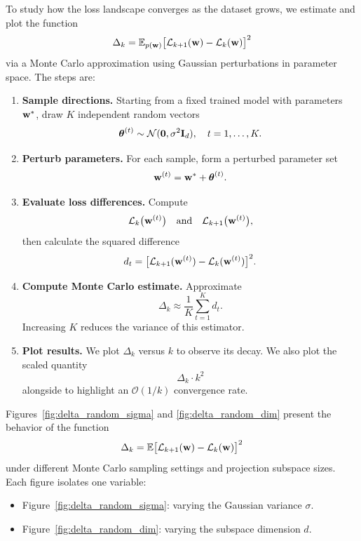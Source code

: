 \documentclass{article}
\begin{document}
To study how the loss landscape converges as the dataset grows, we estimate and plot the function
$$
  \Delta_k =
  \mathbb{E}_{p(\mathbf{w})} \bigl[ \mathcal{L}_{k+1}(\mathbf{w}) - \mathcal{L}_k(\mathbf{w}) \bigr]^2
$$
via a Monte Carlo approximation using Gaussian perturbations in parameter space. The steps are:

\begin{enumerate}
  \item \textbf{Sample directions.}
        Starting from a fixed trained model with parameters $\mathbf{w}^*$, draw $K$ independent random vectors
        $$
          \boldsymbol{\theta}^{(t)} \sim \mathcal{N} (\mathbf 0, \sigma^2 \mathbf I_d), \quad
          t = 1, \dots, K.
        $$

  \item \textbf{Perturb parameters.}
        For each sample, form a perturbed parameter set
        $$
          \mathbf{w}^{(t)} =
          \mathbf{w}^* + \boldsymbol{\theta}^{(t)}.
        $$

  \item \textbf{Evaluate loss differences.}
        Compute
        $$
          \mathcal{L}_k \bigl( \mathbf{w}^{(t)} \bigr) \quad
          \text{and} \quad
          \mathcal{L}_{k+1} \bigl( \mathbf{w}^{(t)} \bigr),
        $$
        then calculate the squared difference
        $$
          d_t =
          \bigl[ \mathcal{L}_{k+1} (\mathbf{w}^{(t)}) - \mathcal{L}_k (\mathbf{w}^{(t)}) \bigr]^2.
        $$

  \item \textbf{Compute Monte Carlo estimate.}
        Approximate
        $$
          \Delta_k \approx
          \frac{1}{K} \sum_{t=1}^K d_t.
        $$
        Increasing $K$ reduces the variance of this estimator.

  \item \textbf{Plot results.}
        We plot $\Delta_k$ versus $k$ to observe its decay. We also plot the scaled quantity
        $$
          \Delta_k \cdot k^2
        $$
        alongside to highlight an $\mathcal O(1 / k)$ convergence rate.
\end{enumerate}

Figures~\ref{fig:delta_random_sigma} and \ref{fig:delta_random_dim} present the behavior of the function
$$
  \Delta_k =
  \mathbb{E} \bigl[ \mathcal{L}_{k+1}(\mathbf{w}) - \mathcal{L}_k(\mathbf{w}) \bigr]^2
$$
under different Monte Carlo sampling settings and projection subspace sizes. Each figure isolates one variable:

\begin{itemize}
  \item Figure~\ref{fig:delta_random_sigma}: varying the Gaussian variance $\sigma$.
  \item Figure~\ref{fig:delta_random_dim}: varying the subspace dimension $d$.
\end{itemize}
\end{document}
